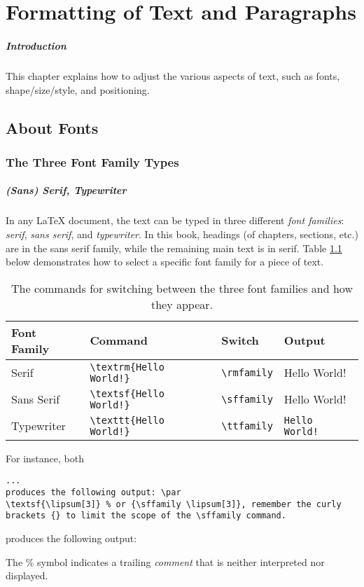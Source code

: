 \chapter{Formatting of Text and Paragraphs}

\paragraph{Introduction} This chapter explains how to adjust the various aspects of text, such as fonts, shape/size/style, and positioning.

\section{About Fonts}

\subsection{The Three Font Family Types}

\paragraph{(Sans) Serif, Typewriter} In any \LaTeX{} document, the text can be typed in three different \textit{font families}: \textit{serif}, \textit{sans serif}, and \textit{typewriter}. In this book, headings (of chapters, sections, etc.) are in the sans serif family, while the remaining main text is in serif. Table \ref{tab:fontfamily} below demonstrates how to select a specific font family for a piece of text.
\begin{table}
\begin{tabularx}{\textwidth}{|l|X|l|l|}
\hline
Font Family & Command & Switch & Output \\
\hline
Serif & \texttt{\textbackslash textrm\{Hello World!\}}& \texttt{\textbackslash rmfamily} & \textrm{Hello World!} \\
\hline
Sans Serif & \texttt{\textbackslash textsf\{Hello World!\}}& \texttt{\textbackslash sffamily} & \textsf{Hello World!} \\
\hline
Typewriter & \texttt{\textbackslash texttt\{Hello World!\}}& \texttt{\textbackslash ttfamily} & \texttt{Hello World!} \\
\hline
\end{tabularx}
\caption{The commands for switching between the three font families and how they appear.}
\label{tab:fontfamily}
\end{table}
For instance, both
\begin{lstlisting}
... 
produces the following output: \par
\textsf{\lipsum[3]} % or {\sffamily \lipsum[3]}, remember the curly brackets {} to limit the scope of the \sffamily command.
\end{lstlisting}
produces the following output: \par
{\sffamily \lipsum[3]} \par
The \% symbol indicates a trailing \textit{comment} that is neither interpreted nor displayed.

